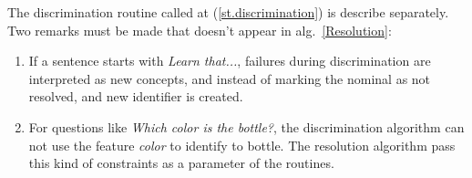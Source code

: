 \documentclass[a4paper]{article}
\begin{document}
The discrimination routine called at (\ref{st.discrimination}) is describe separately. 
Two remarks must be made that doesn't appear in alg.~\ref{Resolution}:
\begin{enumerate}
    \item If a sentence starts with {\it Learn that...}, failures during 
    discrimination are interpreted as new concepts, and instead of marking the 
    nominal as not resolved, and new identifier is created.
    \item For questions like {\it Which color is the bottle?}, the discrimination 
    algorithm can not use the feature {\it color} to identify to bottle. The 
    resolution algorithm pass this kind of constraints as a parameter of the 
     routines.
\end{enumerate}
\end{document}

